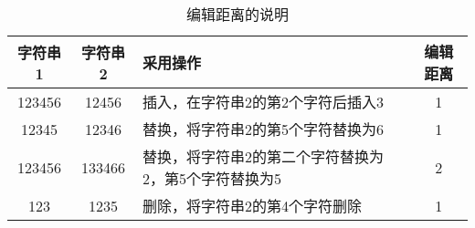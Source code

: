 \begin{table}[h] %
	\centering
	\caption{编辑距离的说明}
	\begin{tabular}{ c c p{6cm} c }
		\toprule
		字符串1 & 字符串2 & 采用操作 & 编辑距离 \\
		\midrule
		123456 & 12456 & 插入，在字符串2的第2个字符后插入3 & 1 \\
		12345 & 12346 & 替换，将字符串2的第5个字符替换为6 & 1 \\
		123456 & 133466 & 替换，将字符串2的第二个字符替换为2，第5个字符替换为5 & 2 \\
		123 & 1235 & 删除，将字符串2的第4个字符删除 & 1 \\
		\bottomrule
	\end{tabular}
\end{table}
